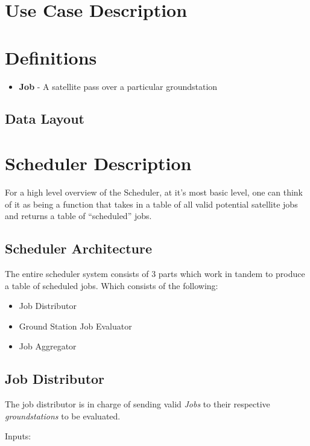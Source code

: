 \documentclass{article}
\begin{document}
\section{Use Case Description}

\section{Definitions}

\begin{itemize}
  \item \textbf{Job} - A satellite pass over a particular groundstation
\end{itemize}

\subsection{Data Layout}


\section{Scheduler Description}

For a high level overview of the Scheduler, at it's most basic level, one can
think of it as being a function that takes in a table of all valid potential
satellite jobs and returns a table of ``scheduled'' jobs.

\subsection{Scheduler Architecture}

The entire scheduler system consists of 3 parts which work in tandem to produce
a table of scheduled jobs. Which consists of the following:

\begin{itemize}
\item Job Distributor
\item Ground Station Job Evaluator
\item Job Aggregator
\end{itemize}

\subsection{Job Distributor}

The job distributor is in charge of sending valid \textit{Jobs} to their
respective \textit{groundstations} to be evaluated.

\noindent
Inputs:
\end{document}
